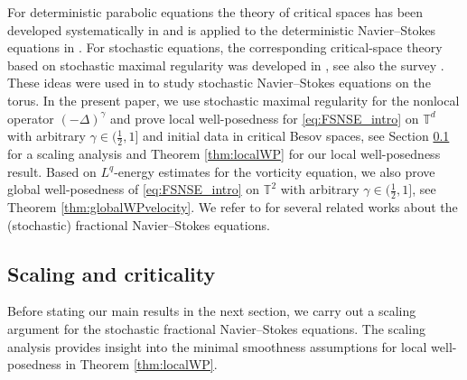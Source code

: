 \documentclass[11pt, a4paper,oneside, reqno]{amsart}
\theoremstyle{remark} %
\theoremstyle{definition} %
\numberwithin{theorem}{section}
\numberwithin{equation}{section}
\newcommand{\T}{\mathbb{T}}
\newcommand{\gam}{\gamma}
\begin{document}
For deterministic parabolic equations the theory of critical spaces has been developed systematically in \cite{PSW18} and is applied to the deterministic Navier--Stokes equations in \cite{PW18}. For stochastic equations, the corresponding critical-space theory based on stochastic maximal regularity was developed in \cite{AV22,AV22_part2}, see also the survey \cite{AV25_survey}. These ideas were
used in \cite{AV24_SNSE} to study stochastic Navier--Stokes equations on the torus. In the present paper, we use stochastic maximal regularity for the nonlocal operator $(-\Delta)^\gam$ and prove local well-posedness for \eqref{eq:FSNSE_intro} on $\T^d$ with arbitrary $\gam\in (\frac 12, 1]$ and initial data in critical Besov spaces, see Section \ref{subsec:scaling} for a scaling analysis and Theorem \ref{thm:localWP} for our local well-posedness result. Based on $L^q$-energy estimates for the vorticity equation, we also prove global well-posedness of \eqref{eq:FSNSE_intro} on $\T^2$ with arbitrary $\gam\in(\frac 12, 1]$, see Theorem \ref{thm:globalWPvelocity}.
We refer to \cite{De16, Wu04,YWS22} for several related works about the (stochastic) fractional Navier--Stokes equations. 

\subsection{Scaling and criticality}\label{subsec:scaling}
Before stating our main results in the next section, we carry out a scaling argument for the stochastic fractional Navier--Stokes equations. The scaling analysis provides insight into the minimal smoothness assumptions for local well-posedness in Theorem \ref{thm:localWP}. 
\end{document}
